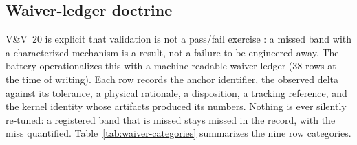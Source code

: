 \subsection{Waiver-ledger doctrine}

V\&V~20 is explicit that validation is not a pass/fail exercise
\citep{asme2009vv20}: a missed band with a characterized mechanism is a
result, not a failure to be engineered away. The battery operationalizes
this with a machine-readable waiver ledger (38 rows at the time of
writing). Each row
records the anchor identifier, the observed delta against its tolerance, a
physical rationale, a disposition, a tracking reference, and the kernel
identity whose artifacts produced its numbers. Nothing is ever silently
re-tuned: a registered band that is missed stays missed in the record, with
the miss quantified. Table~\ref{tab:waiver-categories} summarizes the nine
row categories.

